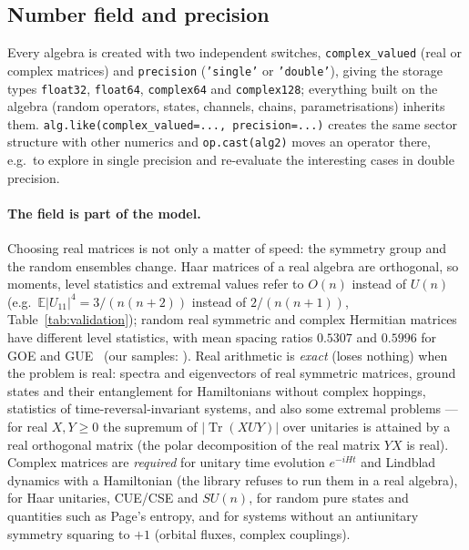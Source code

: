 \documentclass[11pt]{article}
\DeclareMathOperator{\Tr}{Tr}
\begin{document}
\subsection*{Number field and precision}\label{sec:numerics}

Every algebra is created with two independent switches, \texttt{complex\_valued} (real or complex
matrices) and \texttt{precision} (\texttt{'single'} or \texttt{'double'}), giving the storage types
\texttt{float32}, \texttt{float64}, \texttt{complex64} and \texttt{complex128}; everything built on the
algebra (random operators, states, channels, chains, parametrisations) inherits them.
\texttt{alg.like(complex\_valued=..., precision=...)} creates the same sector structure with other
numerics and \texttt{op.cast(alg2)} moves an operator there, e.g.\ to explore in single precision and
re-evaluate the interesting cases in double precision.

\paragraph{The field is part of the model.} Choosing real matrices is not only a matter of speed: the
symmetry group and the random ensembles change. Haar matrices of a real algebra are orthogonal, so
moments, level statistics and extremal values refer to $O(n)$ instead of $U(n)$
(e.g.\ $\mathbb E|U_{11}|^4=3/(n(n+2))$ instead of $2/(n(n+1))$, Table~\ref{tab:validation}); random
real symmetric and complex Hermitian matrices have different level statistics, with mean spacing ratios
$0.5307$ and $0.5996$ for GOE and GUE~\cite{atas2013}
(our samples: ). Real arithmetic is \emph{exact} (loses nothing) when the problem is
real: spectra and eigenvectors of real symmetric matrices, ground states and their entanglement for
Hamiltonians without complex hoppings, statistics of time-reversal-invariant systems, and also some
extremal problems — for real $X,Y\ge0$ the supremum of $|\Tr(XUY)|$ over unitaries is attained by a real
orthogonal matrix (the polar decomposition of the real matrix $YX$ is real). Complex matrices are
\emph{required} for unitary time evolution $e^{-iHt}$ and Lindblad dynamics with a Hamiltonian (the library
refuses to run them in a real algebra), for Haar unitaries, CUE/CSE and $SU(n)$, for random pure states
and quantities such as Page's entropy, and for systems without an antiunitary symmetry squaring to $+1$ (orbital fluxes, complex
couplings).
\end{document}
